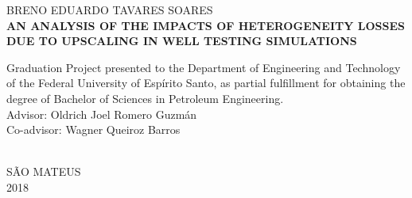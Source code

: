 \begin{titlepage}
	\center
	
	\textsc{BRENO EDUARDO TAVARES SOARES}\\[116pt]
	
	\textsc{\textbf{AN ANALYSIS OF THE IMPACTS OF HETEROGENEITY LOSSES DUE TO UPSCALING IN WELL TESTING SIMULATIONS}}\\[104pt]
	
\hfill\begin{minipage}{0.5\linewidth}
Graduation Project presented to the Department of Engineering and Technology of the Federal University of Esp\'irito Santo, as partial fulfillment for obtaining the degree of Bachelor of Sciences in Petroleum Engineering.\\[12pt]
Advisor: Oldrich Joel Romero Guzm\'an\\
Co-advisor: Wagner Queiroz Barros 
\end{minipage}\\[116pt]

	\textsc{S\~AO MATEUS}\\
	\textsc{2018}\\
\end{titlepage}
